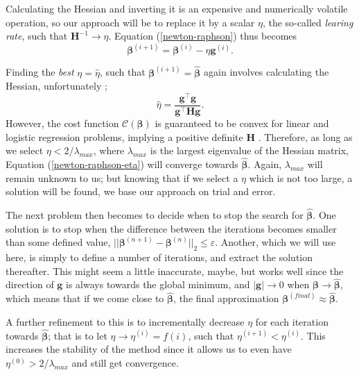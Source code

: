 \documentclass[]{article}
\begin{document}
Calculating the Hessian and inverting it is an expensive and numerically volatile operation, so our approach will be to replace it by a scalar $\eta$, the so-called \textit{learing rate}, such that $\mathbf{H}^{-1} \rightarrow \eta$. Equation (\ref{newton-raphson}) thus becomes
\begin{equation} \label{newton-raphson-eta}
	\mathbf{\beta}^{(i+1)} = \mathbf{\beta}^{(i)} - \eta \mathbf{g}^{(i)}.
\end{equation}

Finding the \textit{best} $\eta = \hat{\eta}$, such that $\mathbf{\beta}^{(i+1)} = \mathbf{\hat{\beta}}$ again involves calculating the Hessian, unfortunately \cite{fys-stk4155-notes}; 
\begin{equation}
	\hat{\eta} = \frac{\mathbf{g}^\intercal \mathbf{g}}{\mathbf{g}^\intercal \mathbf{H} \mathbf{g}}.
\end{equation}
However, the cost function $\mathcal{C}(\mathbf{\beta})$ is guaranteed to be convex for linear and logistic regression problems, implying a positive definite $\mathbf{H}$ \cite{murphy2012machine}. Therefore, as long as we select $\eta < 2/\lambda_{max}$, where $\lambda_{max}$ is the largest eigenvalue of the Hessian matrix, Equation (\ref{newton-raphson-eta}) will converge towards $\mathbf{\hat{\beta}}$. Again, $\lambda_{max}$ will remain unknown to us; but knowing that if we select a $\eta$ which is not too large, a solution will be found, we base our approach on trial and error. 

The next problem then becomes to decide when to stop the search for $\mathbf{\hat{\beta}}$. One solution is to stop when the difference between the iterations becomes smaller than some defined value, $||\mathbf{\beta}^{(n+1)} - \mathbf{\beta}^{(n)}||_2 \le \varepsilon$. Another, which we will use here, is simply to define a number of iterations, and extract the solution thereafter. This might seem a little inaccurate, maybe, but works well since the direction of $\mathbf{g}$ is always towards the global minimum, and $|\mathbf{g}| \rightarrow 0$ when $\mathbf{\beta} \rightarrow \mathbf{\hat{\beta}}$, which means that if we come close to $\mathbf{\hat{\beta}}$, the final approximation $\mathbf{\beta}^{(final)} \approx \mathbf{\hat{\beta}}$.

A further refinement to this is to incrementally decrease $\eta$ for each iteration towards $\mathbf{\hat{\beta}}$; that is to let $\eta \rightarrow \eta^{(i)} = f(i)$, such that $\eta^{(i+1)} < \eta^{(i)}$. This increases the stability of the method since it allows us to even have $\eta^{(0)} > 2/\lambda_{max}$ and still get convergence.
\end{document}
